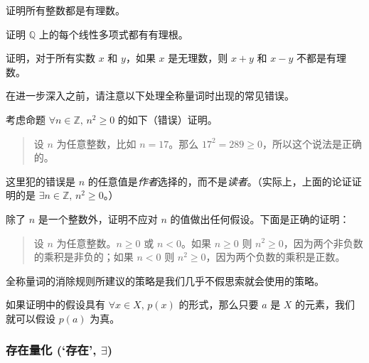 \begin{exercise}
\label{exEveryIntegerIsRational}
证明所有整数都是有理数。
\end{exercise}

\begin{exercise}
证明 $\mathbb{Q}$ 上的每个线性多项式都有有理根。
\end{exercise}

\begin{exercise}
证明，对于所有实数 $x$ 和 $y$，如果 $x$ 是无理数，则 $x+y$ 和 $x-y$ 不都是有理数。
\end{exercise}

在进一步深入之前，请注意以下处理全称量词时出现的常见错误。

\begin{commonerror}
考虑命题 $\forall n \in \mathbb{Z},\, n^2 \ge 0$ 的如下（错误）证明。

\begin{quote}
设 $n$ 为任意整数，比如 $n=17$。那么 $17^2 = 289 \ge 0$，所以这个说法是正确的。
\end{quote}

这里犯的错误是 $n$ 的任意值是\textit{作者}选择的，而不是\textit{读者}。（实际上，上面的论证证明的是 $\exists n \in \mathbb{Z},\, n^2 \ge 0$。）

除了 $n$ 是一个整数外，证明不应对 $n$ 的值做出任何假设。下面是正确的证明：

\begin{quote}
设 $n$ 为任意整数。$n \ge 0$ 或 $n < 0$。如果 $n \ge 0$ 则 $n^2 \ge 0$，因为两个非负数的乘积是非负的；如果 $n<0$ 则 $n^2 \ge 0$，因为两个负数的乘积是正数。
\end{quote}
\end{commonerror}

全称量词的消除规则所建议的策略是我们几乎不假思索就会使用的策略。

\begin{strategy}[全称量化陈述假设]
\label{strAssumingUniversal}
如果证明中的假设具有 $\forall x \in X,\, p(x)$ 的形式，那么只要 $a$ 是 $X$ 的元素，我们就可以假设 $p(a)$ 为真。
\end{strategy}

\subsubsection*{存在量化 (`存在', $\exists$)}

